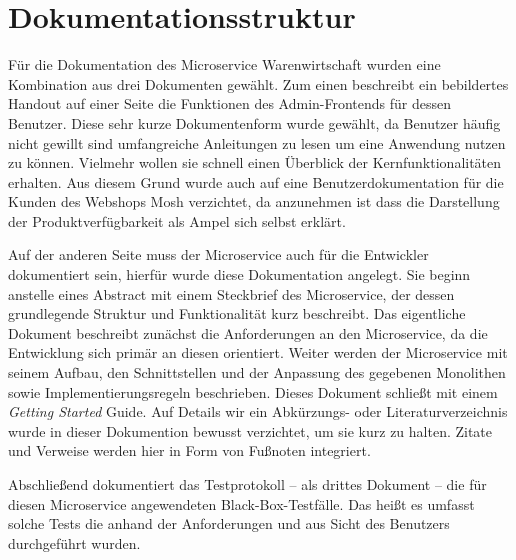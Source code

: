 \section{Dokumentationsstruktur}
\label{sec: Dokumentationsstruktur}

Für die Dokumentation des Microservice Warenwirtschaft wurden eine Kombination aus drei Dokumenten gewählt. Zum einen beschreibt ein bebildertes Handout auf einer Seite die Funktionen des Admin-Frontends für dessen Benutzer. Diese sehr kurze Dokumentenform wurde gewählt, da Benutzer häufig nicht gewillt sind umfangreiche Anleitungen zu lesen um eine Anwendung nutzen zu können. Vielmehr wollen sie schnell einen Überblick der Kernfunktionalitäten erhalten. Aus diesem Grund wurde auch auf eine Benutzerdokumentation für die Kunden des Webshops Mosh verzichtet, da anzunehmen ist dass die Darstellung der Produktverfügbarkeit als Ampel sich selbst erklärt.\par 
Auf der anderen Seite muss der Microservice auch für die Entwickler dokumentiert sein, hierfür wurde diese Dokumentation angelegt. Sie beginn anstelle eines Abstract mit einem Steckbrief des Microservice, der dessen grundlegende Struktur und Funktionalität kurz beschreibt. Das eigentliche Dokument beschreibt zunächst die Anforderungen an den Microservice, da die Entwicklung sich primär an diesen orientiert. Weiter werden der Microservice mit seinem Aufbau, den Schnittstellen und der Anpassung des gegebenen Monolithen sowie Implementierungsregeln beschrieben. Dieses Dokument schließt mit einem \textit{Getting Started} Guide. Auf Details wir ein Abkürzungs- oder Literaturverzeichnis wurde in dieser Dokumention bewusst verzichtet, um sie kurz zu halten. Zitate und Verweise werden hier in Form von Fußnoten integriert.\par 
Abschließend dokumentiert das Testprotokoll -- als drittes Dokument -- die für diesen Microservice angewendeten Black-Box-Testfälle. Das heißt es umfasst solche Tests die anhand der Anforderungen und aus Sicht des Benutzers durchgeführt wurden.